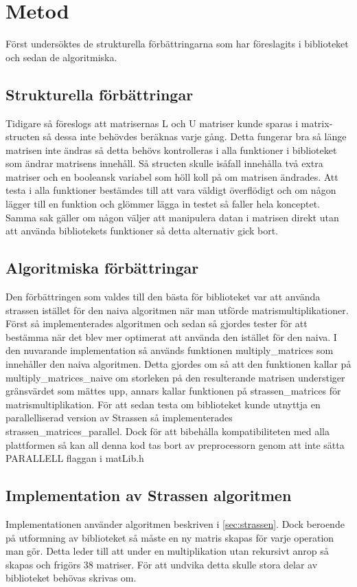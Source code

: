 \section{Metod}
Först undersöktes de strukturella förbättringarna som har föreslagits i biblioteket och sedan de algoritmiska.
\subsection{Strukturella förbättringar}
Tidigare så föreslogs att matrisernas L och U matriser kunde sparas i matrix-structen så dessa inte behövdes beräknas varje gång. Detta fungerar bra så länge matrisen inte ändras så detta behövs kontrolleras i alla funktioner i biblioteket som ändrar matrisens innehåll. Så structen skulle isåfall innehålla två extra matriser och en booleansk variabel som höll koll på om matrisen ändrades. Att testa i alla funktioner bestämdes till att vara väldigt överflödigt och om någon lägger till en funktion och glömmer lägga in testet så faller hela konceptet. Samma sak gäller om någon väljer att manipulera datan i matrisen direkt utan att använda bibliotekets funktioner så detta alternativ gick bort.

\subsection{Algoritmiska förbättringar}
Den förbättringen som valdes till den bästa för biblioteket var att använda strassen istället för den naiva algoritmen när man utförde matrismultiplikationer. Först så implementerades algoritmen och sedan så gjordes tester för att bestämma när det blev mer optimerat att använda den istället för den naiva. I den nuvarande implementation så används funktionen multiply\_matrices som innehåller den naiva algoritmen. Detta gjordes om så att den funktionen kallar på multiply\_matrices\_naive om storleken på den resulterande matrisen understiger gränsvärdet som mättes upp, annars kallar funktionen på strassen\_matrices för matrismultiplikation. 
\newline
\newline
För att sedan testa om biblioteket kunde utnyttja en parallelliserad version av Strassen så implementerades  strassen\_matrices\_parallel. Dock för att bibehålla kompatibiliteten med alla plattformen så kan all denna kod tas bort av preprocessorn genom att inte sätta PARALLELL flaggan i matLib.h
\subsection{Implementation av Strassen algoritmen}
Implementationen använder algoritmen beskriven i \ref{sec:strassen}. Dock beroende på utformning av biblioteket så måste en ny matris skapas för varje operation man gör. Detta leder till att under en multiplikation utan rekursivt anrop så skapas och frigörs 38 matriser. För att undvika detta skulle stora delar av biblioteket behövas skrivas om. 

